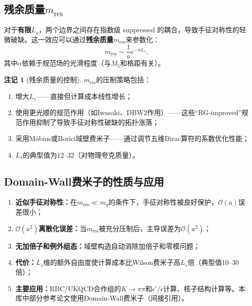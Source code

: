 \documentclass[12pt,a4paper]{ctexart}
\theoremstyle{definition}
\newtheorem{remark}{注记}[section]
\begin{document}
\subsection{残余质量$m_{\text{res}}$}

对于\textbf{有限}$L_s$，两个边界之间存在指数级 suppressed 的耦合，导致手征对称性的轻微破缺。这一效应可以通过\textbf{残余质量}$m_{\text{res}}$来参数化：
\begin{equation}
m_{\text{res}} \sim \frac{1}{a} e^{-\alpha L_s},
\label{eq:mres}
\end{equation}
其中$\alpha$依赖于规范场的光滑程度（与$M_5$和格距有关）。

\begin{remark}[残余质量的控制]
$m_{\text{res}}$的压制策略包括：
\begin{enumerate}[nosep]
    \item 增大$L_s$——直接但计算成本线性增长；
    \item 使用更光顺的规范作用（如Iwasaki、DBW2作用）——这些``RG-improved''规范作用抑制了导致手征对称性破缺的拓扑涨落；
    \item 采用M\"obius或Borici域壁费米子——通过调节五维Dirac算符的系数优化性能；
    \item $L_s$的典型值为12--32（对物理夸克质量）。
\end{enumerate}
\end{remark}

\subsection{Domain-Wall费米子的性质与应用}

\begin{enumerate}[leftmargin=*]
    \item \textbf{近似手征对称性：}在$m_{\text{res}} \ll m_q$的条件下，手征对称性被良好保护，$\mathcal{O}(a)$误差很小；
    \item \textbf{$\mathcal{O}(a^2)$离散化误差：}当$m_{\text{res}}$被充分压制后，主导误差为$\mathcal{O}(a^2)$；
    \item \textbf{无加倍子和例外组态：}域壁构造自动消除加倍子和零模问题；
    \item \textbf{代价：}$L_s$维的额外自由度使计算成本比Wilson费米子高$L_s$倍（典型值10--30倍）；
    \item \textbf{主要应用：}RBC/UKQCD合作组的$K\to\pi\pi$和$\epsilon'/\epsilon$计算、核子结构计算等。本库中部分参考论文使用Domain-Wall费米子（间接引用）。
\end{enumerate}
\end{document}
